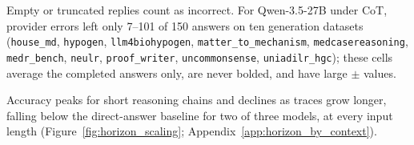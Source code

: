 Empty or truncated replies count as incorrect. For Qwen-3.5-27B under CoT, provider errors left only 7--101 of 150 answers on ten generation datasets (\texttt{house\_md}, \texttt{hypogen}, \texttt{llm4biohypogen}, \texttt{matter\_to\_mechanism}, \texttt{medcasereasoning}, \texttt{medr\_bench}, \texttt{neulr}, \texttt{proof\_writer}, \texttt{uncommonsense}, \texttt{uniadilr\_hgc}); these cells average the completed answers only, are never bolded, and have large $\pm$ values.


Accuracy peaks for short reasoning chains and declines as traces grow longer, falling below the direct-answer baseline for two of three models, at every input length (Figure~\ref{fig:horizon_scaling}; Appendix~\ref{app:horizon_by_context}).


